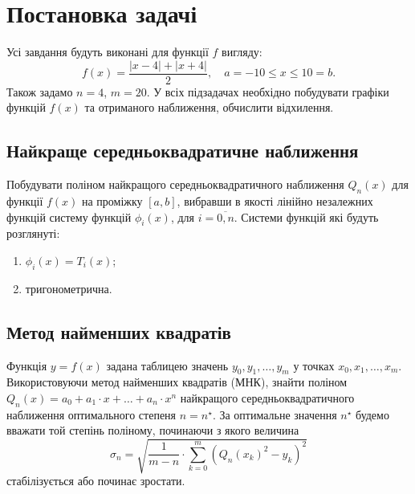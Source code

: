 




\tableofcontents

\section{Постановка задачі}

Усі завдання будуть виконані для функції $f$ вигляду: \[ f(x) = \frac{|x - 4| + |x + 4|}{2}, \quad a = -10 \le x \le 10 = b. \] Також задамо $n = 4$, $m = 20$. У всіх підзадачах необхідно побудувати графіки функцій $f(x)$ та отриманого наближення, обчислити відхилення.

\subsection{Найкраще середньоквадратичне наближення}

Побудувати поліном найкращого середньоквадратичного наближення $Q_n(x)$ для функції $f(x)$ на проміжку $[a, b]$, вибравши в якості лінійно незалежних функцій систему функцій $\phi_i(x)$, для $i=\overline{0,n}$. Системи функцій які будуть розглянуті:
\begin{enumerate}
    \item $\phi_i(x) = T_i(x)$;
    \item тригонометрична.
\end{enumerate}

\subsection{Метод найменших квадратів}

Функція $y = f(x)$ задана таблицею значень $y_0, y_1, \ldots, y_m$ у точках $x_0, x_1, \ldots, x_m$. Використовуючи метод найменших квадратів (МНК), знайти поліном $Q_n(x) = a_0 + a_1 \cdot x + \ldots + a_n \cdot x^n$ найкращого середньоквадратичного наближення оптимального степеня $n = n^\star$. За оптимальне значення $n^\star$ будемо вважати той степінь поліному, починаючи з якого величина \[ \sigma_n = \sqrt{\frac{1}{m - n} \cdot \sum_{k = 0}^m (Q_n(x_k)^2 - y_k)^2} \] стабілізується або починає зростати.

